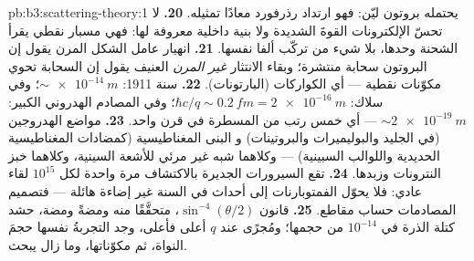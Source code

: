 \begin{solution}{pb:b3:scattering-theory:1}
يحتمله بروتون ليّن: فهو ارتداد رذرفورد معادًا تمثيله.
\textbf{20.} لا تحسّ الإلكترونات القوةَ الشديدة ولا بنية
داخلية معروفة لها: فهي مسبار نقطي يقرأ الشحنة وحدها، بلا
شيء من تركّب ألفا نفسها.
\textbf{21.} انهيار عامل الشكل المرن يقول إن البروتون
سحابة منتشرة؛ وبقاء الانتثار \emph{غير المرن} العنيف يقول
إن السحابة تحوي مكوّنات نقطية ---
أي الكواركات (البارتونات).
\textbf{22.} سنة 1911: $\sim\qty{e-14}{m}$؛ وفي سلاك: $\hbar c/q \sim
\qty{0.2}{fm} = \qty{2e-16}{m}$؛ وفي المصادم الهدروني الكبير: $\sim\qty{2e-19}{m}$ ---
أي خمس رتب من المسطرة في قرن واحد.
\textbf{23.} مواضع الهدروجين (في الجليد والبوليميرات والبروتينات) و
البنى المغناطيسية (كمضادات المغناطيسية الحديدية واللوالب السبينية) --- وكلاهما
شبه غير مرئي للأشعة السينية، وكلاهما خبز النترونات وزبدها.
\textbf{24.} تقع السيرورات الجديرة بالاكتشاف مرة واحدة لكل
$10^{15}$ لقاء عادي: فلا يحوّل الفمتوبارنات إلى أحداث في السنة
غير إضاءة هائلة --- فتصميم المصادمات حساب
مقاطع.
\textbf{25.} قانون $\sin^{-4}(\theta/2)$، متحقَّقًا منه ومضةً ومضة،
حشد كتلة الذرة في $10^{-14}$ من حجمها؛ ومُجرًى
عند $q$ أعلى فأعلى، وجد التجربةُ نفسها حجمَ النواة،
ثم مكوّناتها، وما زال يبحث.
\end{solution}
